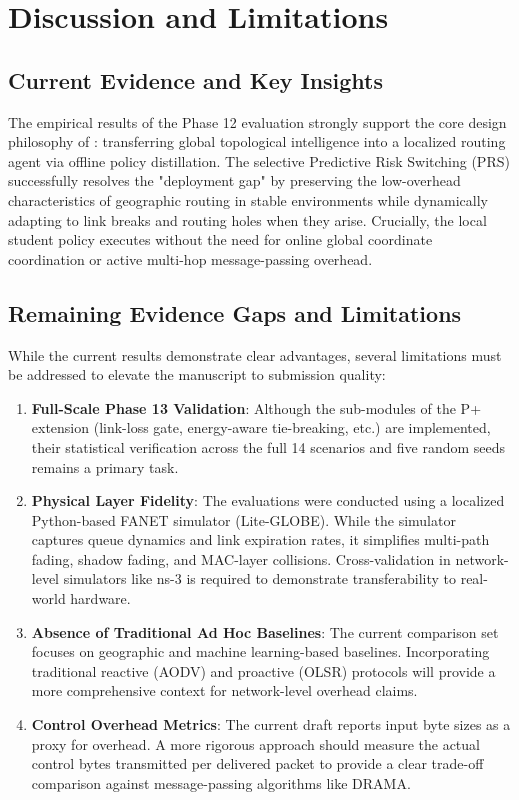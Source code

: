 \section{Discussion and Limitations}
\label{sec:discussion}

\subsection{Current Evidence and Key Insights}
The empirical results of the Phase 12 evaluation strongly support the core design philosophy of \method: transferring global topological intelligence into a localized routing agent via offline policy distillation. The selective Predictive Risk Switching (PRS) successfully resolves the "deployment gap" by preserving the low-overhead characteristics of geographic routing in stable environments while dynamically adapting to link breaks and routing holes when they arise. Crucially, the local student policy executes without the need for online global coordinate coordination or active multi-hop message-passing overhead.

\subsection{Remaining Evidence Gaps and Limitations}
While the current results demonstrate clear advantages, several limitations must be addressed to elevate the manuscript to submission quality:
\begin{enumerate}
    \item \textbf{Full-Scale Phase 13 Validation}: Although the sub-modules of the P+ extension (link-loss gate, energy-aware tie-breaking, etc.) are implemented, their statistical verification across the full 14 scenarios and five random seeds remains a primary task.
    \item \textbf{Physical Layer Fidelity}: The evaluations were conducted using a localized Python-based FANET simulator (Lite-GLOBE). While the simulator captures queue dynamics and link expiration rates, it simplifies multi-path fading, shadow fading, and MAC-layer collisions. Cross-validation in network-level simulators like ns-3 is required to demonstrate transferability to real-world hardware.
    \item \textbf{Absence of Traditional Ad Hoc Baselines}: The current comparison set focuses on geographic and machine learning-based baselines. Incorporating traditional reactive (AODV) and proactive (OLSR) protocols will provide a more comprehensive context for network-level overhead claims.
    \item \textbf{Control Overhead Metrics}: The current draft reports input byte sizes as a proxy for overhead. A more rigorous approach should measure the actual control bytes transmitted per delivered packet to provide a clear trade-off comparison against message-passing algorithms like DRAMA.
\end{enumerate}

